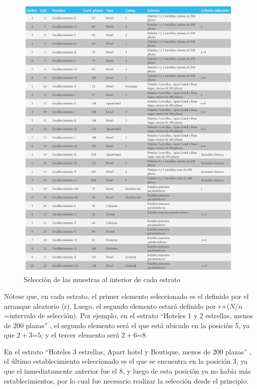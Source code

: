 \documentclass[
]{book}
\begin{document}
\begin{figure}

{\centering \includegraphics[width=1\linewidth]{imagenes/tabla_3} 

}

\caption{Selección de las muestras al interior de cada estrato}\label{fig:muestra-interior}
\end{figure}

Nótese que, en cada estrato, el primer elemento seleccionado es el definido por el arranque aleatorio (r). Luego, el segundo elemento estará definido por \(r\)+(\(N/n\)=intervalo de selección). Por ejemplo, en el estrato ``Hoteles 1 y 2 estrellas, menos de 200 plazas'' , el segundo elemento será el que está ubicado en la posición 5, ya que \(2+3\)=\(5\); y el tercer elemento será \(2+6\)=\(8\).

En el estrato ``Hoteles 3 estrellas, Apart hotel y Boutique, menos de 200 plazas'' , el último establecimiento seleccionado es el que se encuentra en la posición 3, ya que el inmediatamente anterior fue el 8, y luego de esta posición ya no había más establecimientos, por lo cual fue necesario realizar la selección desde el principio.
\end{document}
